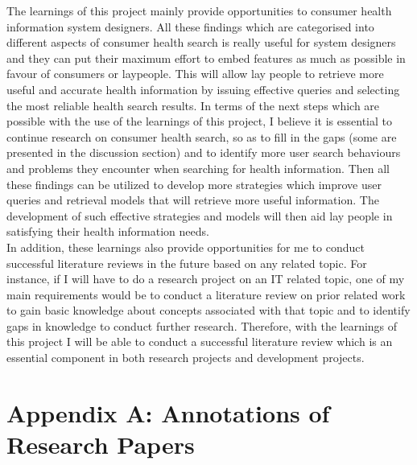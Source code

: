 \documentclass[]{article}
\begin{document}
The learnings of this project mainly provide opportunities to consumer health information system designers. All these findings which are categorised into different aspects of consumer health search is really useful for system designers and they can put their maximum effort to embed features as much as possible in favour of consumers or laypeople. This will allow lay people to retrieve more useful and accurate health information by issuing effective queries and selecting the most reliable health search results. In terms of the next steps which are possible with the use of the learnings of this project, I believe it is essential to continue research on consumer health search, so as to fill in the gaps (some are presented in the discussion section) and to identify more user search behaviours and problems they encounter when searching for health information. Then all these findings can be utilized to develop more strategies which improve user queries and retrieval models that will retrieve more useful information. The development of such effective strategies and models will then aid lay people in satisfying their health information needs. \\
      
In addition, these learnings also provide opportunities for me to conduct successful literature reviews in the future based on any related topic. For instance, if I will have to do a research project on an IT related topic, one of my main requirements would be to conduct a literature review on prior related work to gain basic knowledge about concepts associated with that topic and to identify gaps in knowledge to conduct further research. Therefore, with the learnings of this project I will be able to conduct a successful literature review which is an essential component in both research projects and development projects.

\pagebreak  



  

\pagebreak 

\section*{Appendix A: Annotations of Research Papers} 

\vspace{0.5cm}
\end{document}
